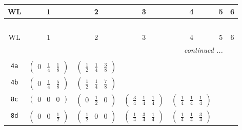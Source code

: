 \documentclass[fleqn,9pt,landscape]{jsarticle}
\begin{document}
\begin{center}
\renewcommand{\arraystretch}{1.2}
\begin{longtable}{ccccccc}
 \hline \hline
WL & 1 & 2 & 3 & 4 & 5 & 6 \\ \hline \endfirsthead

\multicolumn{6}{l}{\tablename\ \thetable{}} \\
 \hline \hline
WL & 1 & 2 & 3 & 4 & 5 & 6 \\ \hline \endhead

 \hline \hline
\multicolumn{6}{r}{\footnotesize\it continued ...} \\ \endfoot

 \hline \hline
\multicolumn{6}{r}{} \\ \endlastfoot

{\tt 4a} & $ \begin{pmatrix} 0 & \frac{1}{4} & \frac{1}{8} \end{pmatrix} $ & $ \begin{pmatrix} \frac{1}{2} & \frac{1}{4} & \frac{3}{8} \end{pmatrix} $ & $  $ & $  $ & $  $ & $  $ \\ \hline
{\tt 4b} & $ \begin{pmatrix} 0 & \frac{1}{4} & \frac{5}{8} \end{pmatrix} $ & $ \begin{pmatrix} \frac{1}{2} & \frac{1}{4} & \frac{7}{8} \end{pmatrix} $ & $  $ & $  $ & $  $ & $  $ \\ \hline
{\tt 8c} & $ \begin{pmatrix} 0 & 0 & 0 \end{pmatrix} $ & $ \begin{pmatrix} 0 & \frac{1}{2} & 0 \end{pmatrix} $ & $ \begin{pmatrix} \frac{3}{4} & \frac{1}{4} & \frac{1}{4} \end{pmatrix} $ & $ \begin{pmatrix} \frac{1}{4} & \frac{1}{4} & \frac{1}{4} \end{pmatrix} $ & $  $ & $  $ \\ \hline
{\tt 8d} & $ \begin{pmatrix} 0 & 0 & \frac{1}{2} \end{pmatrix} $ & $ \begin{pmatrix} \frac{1}{2} & 0 & 0 \end{pmatrix} $ & $ \begin{pmatrix} \frac{1}{4} & \frac{3}{4} & \frac{1}{4} \end{pmatrix} $ & $ \begin{pmatrix} \frac{1}{4} & \frac{1}{4} & \frac{3}{4} \end{pmatrix} $ & $  $ & $  $ \\ \hline

\end{longtable}
\end{center}
\end{document}
